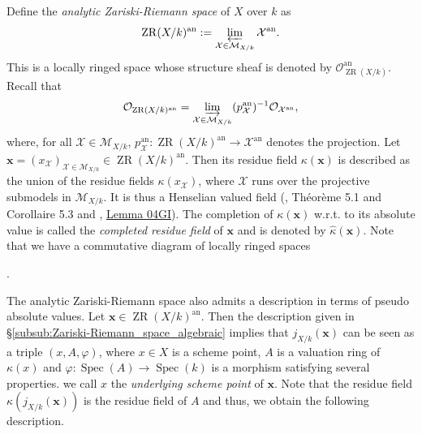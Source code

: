 \documentclass [11pt,reqno]{amsart}
\newcommand{\1}{\mathmybb{1}}
\def\cM{{\mathcal{M}}}
\def\cO{{\mathcal{O}}}
\def\cX{{\mathcal{X}}}
\def\an{\operatorname{an}}
\def\Spec{\operatorname{Spec}}
\def\ZR{\operatorname{ZR}}
\begin{document}
Define the \emph{analytic Zariski-Riemann space} of $X$ over $k$ as
\begin{align*}
\ZR(X/k)^{\an} := \displaystyle\varprojlim_{\cX \in \cM_{X/k}} \cX^{\an}.
\end{align*}
This is a locally ringed space whose structure sheaf is denoted by $\cO^{\an}_{\ZR(X/k)}$. Recall that 
\begin{align*}
\cO_{\ZR(X/k)^{\an}} = \displaystyle\varinjlim_{\cX \in \cM_{X/k}} (p^{\an}_{\cX})^{-1}\cO_{\cX^{\an}},
\end{align*}
where, for all $\cX\in\cM_{X/k}$, $p^{\an}_{\cX} : \ZR(X/k)^{\an}\to \cX^{\an}$ denotes the projection. Let $\mathbf{x}=(x_{\cX})_{\cX\in\cM_{X/k}}\in \ZR(X/k)^{\an}$. Then its residue field $\kappa(\mathbf{x})$ is described as the union of the residue fields $\kappa(x_{\cX})$, where $\cX$ runs over the projective submodels in $\cM_{X/k}$. It is thus a Henselian valued field (\cite{Poineau13a}, Théorème 5.1 and Corollaire 5.3 and \cite{stacks}, \href{https://stacks.math.columbia.edu/tag/04GI}{Lemma 04GI}). The completion of $\kappa(\mathbf{x})$ w.r.t. to its absolute value is called the \emph{completed residue field} of $\mathbf{x}$ and is denoted by $\widehat{\kappa}(\mathbf{x})$. Note that we have a commutative diagram of locally ringed spaces
\begin{center}
.
\end{center}

The analytic Zariski-Riemann space also admits a description in terms of pseudo absolute values. Let $\mathbf{x}\in\ZR(X/k)^{\an}$. Then the description given in \S \ref{subsub:Zariski-Riemann_space_algebraic} implies that $j_{X/k}(\mathbf{x})$ can be seen as a triple $(x,A,\varphi)$, where $x\in X$ is a scheme point, $A$ is a valuation ring of $\kappa(x)$ and $\varphi:\Spec(A)\to\Spec(k)$ is a morphism satisfying several properties. we call $x$ the \emph{underlying scheme point} of $\mathbf{x}$. Note that the residue field $\kappa(j_{X/k}(\mathbf{x}))$ is the residue field of $A$ and thus, we obtain the following description.
\end{document}
